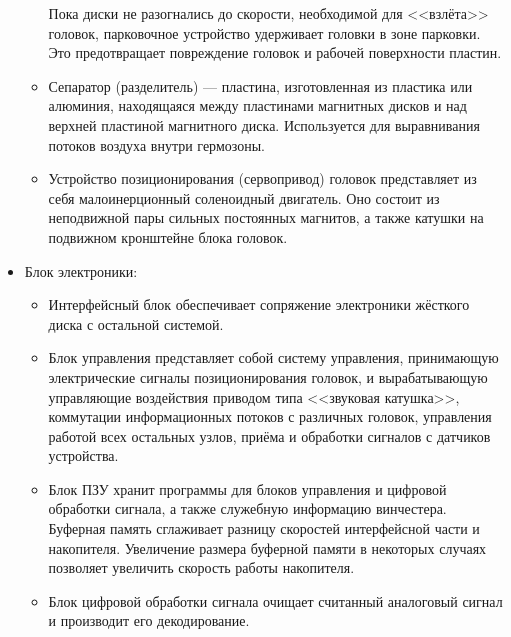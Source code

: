 \begin{itemize}
\begin{itemize}
   Пока диски не разогнались до скорости, необходимой для <<взлёта>> головок, парковочное устройство удерживает головки в зоне парковки.
   Это предотвращает повреждение головок и рабочей поверхности пластин.
   \item Сепаратор (разделитель) --- пластина, изготовленная из пластика или алюминия, находящаяся между пластинами магнитных дисков и над верхней пластиной магнитного диска.
    Используется для выравнивания потоков воздуха внутри гермозоны.
   \item Устройство позиционирования (сервопривод) головок представляет из себя малоинерционный соленоидный двигатель.
    Оно состоит из неподвижной пары сильных постоянных магнитов, а также катушки на подвижном кронштейне блока головок.
  \end{itemize}
 \item Блок электроники:
  \begin{itemize}
   \item Интерфейсный блок обеспечивает сопряжение электроники жёсткого диска с остальной системой.
   \item Блок управления представляет собой систему управления, принимающую электрические сигналы позиционирования головок, и вырабатывающую управляющие воздействия приводом типа <<звуковая катушка>>, коммутации информационных потоков с различных головок, управления работой всех остальных узлов, приёма и обработки сигналов с датчиков устройства.
   \item Блок ПЗУ хранит программы для блоков управления и цифровой обработки сигнала, а также служебную информацию винчестера.
    Буферная память сглаживает разницу скоростей интерфейсной части и накопителя.
    Увеличение размера буферной памяти в некоторых случаях позволяет увеличить скорость работы накопителя.
   \item Блок цифровой обработки сигнала очищает считанный аналоговый сигнал и производит его декодирование.
  \end{itemize}
\end{itemize}


